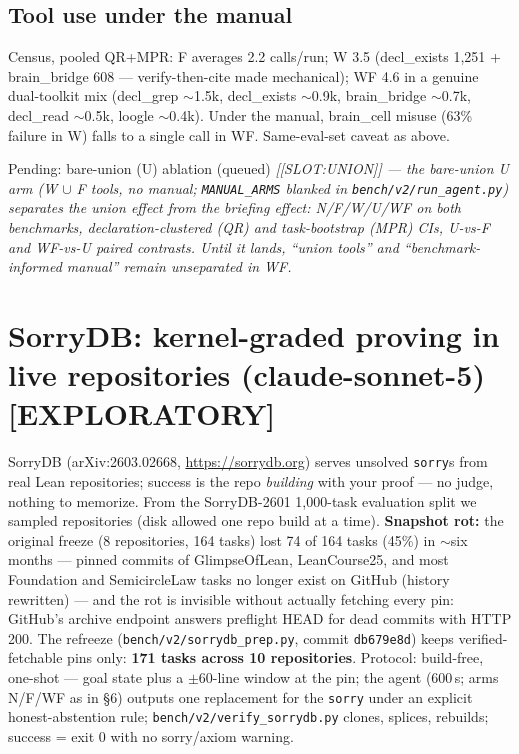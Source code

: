 \documentclass[10pt]{article}
\newcommand{\code}[1]{\texttt{#1}}
\begin{document}
\subsection{Tool use under the manual}\label{sec:tooluse}

Census, pooled QR+MPR: F averages 2.2 calls/run; W 3.5 (decl\_exists
1{,}251 + brain\_bridge 608 --- verify-then-cite made mechanical); WF 4.6
in a genuine dual-toolkit mix (decl\_grep ${\sim}$1.5k, decl\_exists
${\sim}$0.9k, brain\_bridge ${\sim}$0.7k, decl\_read ${\sim}$0.5k, loogle
${\sim}$0.4k). Under the manual, brain\_cell misuse (63\% failure in W)
falls to a single call in WF. Same-eval-set caveat as above.

\begin{pendingbox}{Pending: bare-union (U) ablation (queued)}
\itshape
[[SLOT:UNION]] --- the bare-union U arm (W $\cup$ F tools, no manual;
\code{MANUAL\_ARMS} blanked in \code{bench/v2/run\_agent.py}) separates
the union effect from the briefing effect: N/F/W/U/WF on both benchmarks,
declaration-clustered (QR) and task-bootstrap (MPR) CIs, U-vs-F and
WF-vs-U paired contrasts. Until it lands, ``union tools'' and
``benchmark-informed manual'' remain unseparated in WF.
\end{pendingbox}

\section{SorryDB: kernel-graded proving in live repositories
(claude-sonnet-5) [EXPLORATORY]}\label{sec:sorrydb}

SorryDB (arXiv:2603.02668, \url{https://sorrydb.org}) serves unsolved
\code{sorry}s from real Lean repositories; success is the repo
\emph{building} with your proof --- no judge, nothing to memorize. From
the SorryDB-2601 1{,}000-task evaluation split we sampled repositories
(disk allowed one repo build at a time). \textbf{Snapshot rot:} the
original freeze (8 repositories, 164 tasks) lost 74 of 164 tasks (45\%) in
${\sim}$six months --- pinned commits of GlimpseOfLean, LeanCourse25, and
most Foundation and SemicircleLaw tasks no longer exist on GitHub (history
rewritten) --- and the rot is invisible without actually fetching every
pin: GitHub's archive endpoint answers preflight HEAD for dead commits
with HTTP 200. The refreeze (\code{bench/v2/sorrydb\_prep.py}, commit
\code{db679e8d}) keeps verified-fetchable pins only: \textbf{171 tasks
across 10 repositories}. Protocol: build-free, one-shot --- goal state
plus a $\pm$60-line window at the pin; the agent (600\,s; arms N/F/WF as
in \S6) outputs one replacement for the \code{sorry} under an explicit
honest-abstention rule; \code{bench/v2/verify\_sorrydb.py} clones,
splices, rebuilds; success = exit 0 with no sorry/axiom warning.
\end{document}
